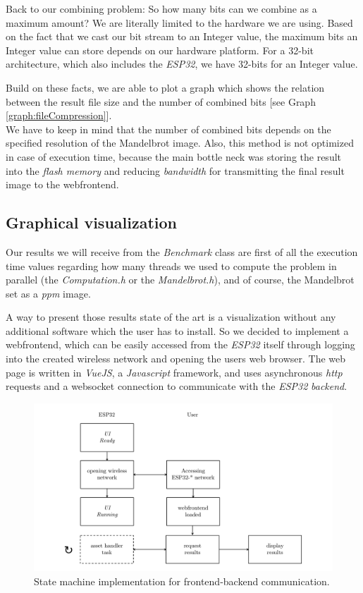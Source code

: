 Back to our combining problem: So how many bits can we combine as a maximum amount? We are literally limited to the hardware we are using. Based on the fact that we cast our bit stream to an Integer value, the maximum bits an Integer value can store depends on our hardware platform. For a 32-bit architecture, which also includes the \textit{ESP32}, we have 32-bits for an Integer value. 

Build on these facts, we are able to plot a graph which shows the relation between the result file size and the number of combined bits [see Graph \ref{graph:fileCompression}].\\

\noindent We have to keep in mind that the number of combined bits depends on the specified resolution of the Mandelbrot image. Also, this method is not optimized in case of execution time, because the main bottle neck was storing the result into the \textit{flash memory} and reducing \textit{bandwidth} for transmitting the final result image to the webfrontend. 

\newpage

\subsection{Graphical visualization} \label{subsection:frontend}

Our results we will receive from the \textit{Benchmark} class are first of all the execution time values regarding how many threads we used to compute the problem in parallel (the \textit{Computation.h} or the \textit{Mandelbrot.h}), and of course, the Mandelbrot set as a \textit{ppm} image.

A way to present those results state of the art is a visualization without any additional software which the user has to install. So we decided to implement a webfrontend, which can be easily accessed from the \textit{ESP32} itself through logging into the created wireless network and opening the users web browser. The web page is written in \textit{VueJS}, a \textit{Javascript} framework, and uses asynchronous \textit{http} requests and a websocket connection to communicate with the \textit{ESP32} \textit{backend}.

\begin{figure}[htbp]
	\centerline{\includegraphics[width=1.1\linewidth]{images/State-Machine-Webforntend.pdf}}
	\caption{ State machine implementation for frontend-backend communication. }
	\label{fig:stateMachineWebfrontend}
\end{figure}  

